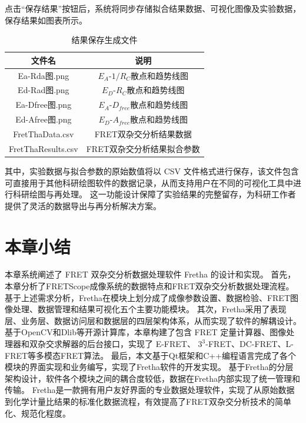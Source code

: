 点击“保存结果”按钮后，系统将同步存储拟合结果数据、可视化图像及实验数据，保存结果如图表所示。
\begin{table}[htbp]
  \centering
  \caption{结果保存生成文件}
  \label{tab:fretha_result_list}
    \begin{tabular}{cc}
      \toprule[1.5pt]
      {文件名} & {说明} \\
      \midrule
      Ea-Rda图.png & $E_A$-$1/R_C$散点和趋势线图 \\
      Ed-Rad图.png & $E_D$-$R_C$散点和趋势线图 \\
      Ea-Dfree图.png & $E_A$-$D_{free}$散点和趋势线图 \\
      Ed-Afree图.png & $E_D$-$A_{free}$散点和趋势线图 \\
      FretThaData.csv & FRET双杂交分析结果数据 \\
      FretThaResults.csv & FRET双杂交分析结果拟合参数 \\
      \bottomrule[1.5pt]
    \end{tabular}
\end{table}
其中，实验数据与拟合参数的原始数值将以 CSV 文件格式进行保存，该文件包含可直接用于其他科研绘图软件的数据记录，从而支持用户在不同的可视化工具中进行科研绘图与再处理。
这一功能设计保障了实验结果的完整留存，为科研工作者提供了灵活的数据导出与再分析解决方案。

\section{本章小结}
本章系统阐述了 FRET 双杂交分析数据处理软件 Fretha 的设计和实现。
首先，本章分析了FRETScope成像系统的数据特点和FRET双杂交分析数据处理流程。
基于上述需求分析，Fretha在模块上划分成了成像参数设置、数据检验、FRET图像处理、数据管理和结果可视化五个主要功能模块。
其次，Fretha采用了表现层、业务层、数据访问层和数据层的四层架构体系，从而实现了软件的解耦设计。
基于OpenCV和Dlib等开源计算库，本章构建了包含 FRET 定量计算器、图像处理器和双杂交求解器的后台接口，实现了 E-FRET、 $3^3$-FRET、DC-FRET、L-FRET等多模态FRET算法。
最后，本文基于Qt框架和C++编程语言完成了各个模块的界面实现和业务编写，实现了Fretha软件的开发实现。
基于Fretha的分层架构设计，软件各个模块之间的耦合度较低，数据在Fretha内部实现了统一管理和传输。
Fretha是一款拥有用户友好界面的专业数据处理软件，实现了从原始数据到化学计量比结果的标准化数据流程，有效提高了FRET双杂交分析技术的简单化、规范化程度。